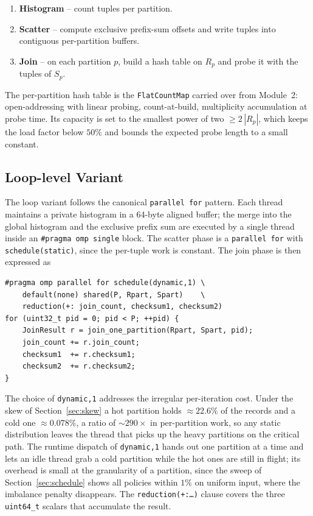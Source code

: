 \documentclass[10pt,twocolumn,a4paper]{article}
\begin{document}
\begin{enumerate}
  \item \textbf{Histogram} -- count tuples per partition.
  \item \textbf{Scatter} -- compute exclusive prefix-sum offsets and
        write tuples into contiguous per-partition buffers.
  \item \textbf{Join} -- on each partition $p$, build a hash table on
        $R_p$ and probe it with the tuples of $S_p$.
\end{enumerate}

The per-partition hash table is the \texttt{FlatCountMap} carried
over from Module~2: open-addressing with linear probing,
count-at-build, multiplicity accumulation at probe time. Its
capacity is set to the smallest power of two $\ge 2\,|R_p|$, which
keeps the load factor below $50\%$ and bounds the expected probe
length to a small constant.

\subsection{Loop-level Variant}
The loop variant follows the canonical \texttt{parallel for} pattern.
Each thread maintains a private histogram in a 64-byte aligned
buffer; the merge into the global histogram and the exclusive prefix
sum are executed by a single thread inside an
\texttt{\#pragma omp single} block. The scatter phase is a
\texttt{parallel for} with \texttt{schedule(static)}, since the
per-tuple work is constant. The join phase is then expressed as

\small\begin{verbatim}
#pragma omp parallel for schedule(dynamic,1) \
    default(none) shared(P, Rpart, Spart)    \
    reduction(+: join_count, checksum1, checksum2)
for (uint32_t pid = 0; pid < P; ++pid) {
    JoinResult r = join_one_partition(Rpart, Spart, pid);
    join_count += r.join_count;
    checksum1  += r.checksum1;
    checksum2  += r.checksum2;
}
\end{verbatim}\normalsize

The choice of \texttt{dynamic,1} addresses the irregular
per-iteration cost. Under the skew of Section~\ref{sec:skew} a hot
partition holds $\approx 22.6\%$ of the records and a cold one
$\approx 0.078\%$, a ratio of $\sim 290\times$ in per-partition
work, so any static distribution leaves the thread that picks up
the heavy partitions on the critical path. The runtime dispatch of \texttt{dynamic,1} hands out
one partition at a time and lets an idle thread grab a cold
partition while the hot ones are still in flight; its overhead is
small at the granularity of a partition, since the sweep of
Section~\ref{sec:schedule} shows all policies within $1\%$ on
uniform input, where the imbalance penalty disappears. The
\texttt{reduction(+:\dots)} clause covers the three
\texttt{uint64\_t} scalars that accumulate the result.
\end{document}
